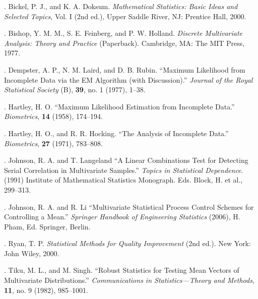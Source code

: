 . Bickel, P. J., and K. A. Doksum. \textit{Mathematical Statistics: Basic Ideas and Selected Topics}, Vol. I (2nd ed.), Upper Saddle River, NJ: Prentice Hall, 2000.

. Bishop, Y. M. M., S. E. Feinberg, and P. W. Holland. \textit{Discrete Multivariate Analysis: Theory and Practice} (Paperback). Cambridge, MA: The MIT Press, 1977.

. Dempster, A. P., N. M. Laird, and D. B. Rubin. ``Maximum Likelihood from Incomplete Data via the EM Algorithm (with Discussion).'' \textit{Journal of the Royal Statistical Society} (B), \textbf{39}, no. 1 (1977), 1--38.

. Hartley, H. O. ``Maximum Likelihood Estimation from Incomplete Data.'' \textit{Biometrics}, \textbf{14} (1958), 174--194.

. Hartley, H. O., and R. R. Hocking. ``The Analysis of Incomplete Data.'' \textit{Biometrics}, \textbf{27} (1971), 783--808.

. Johnson, R. A. and T. Langeland ``A Linear Combinations Test for Detecting Serial Correlation in Multivariate Samples.'' \textit{Topics in Statistical Dependence}. (1991) Institute of Mathematical Statistics Monograph. Eds. Block, H. et al., 299--313.

. Johnson, R. A. and R. Li ``Multivariate Statistical Process Control Schemes for Controlling a Mean.'' \textit{Springer Handbook of Engineering Statistics} (2006), H. Pham, Ed. Springer, Berlin.

. Ryan, T. P. \textit{Statistical Methods for Quality Improvement} (2nd ed.). New York: John Wiley, 2000.

. Tiku, M. L., and M. Singh. ``Robust Statistics for Testing Mean Vectors of Multivariate Distributions.'' \textit{Communications in Statistics---Theory and Methods}, \textbf{11}, no. 9 (1982), 985--1001.
